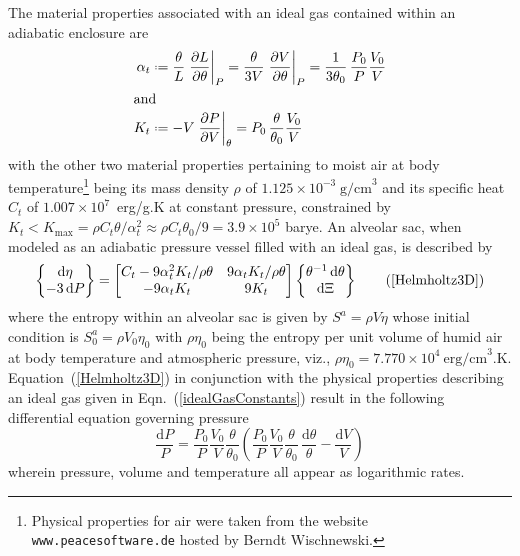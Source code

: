 The material properties associated with an ideal gas contained within an adiabatic enclosure are
\begin{subequations}
    \label{idealGasConstants}
    \begin{align}
\alpha_t & \defeq \frac{\theta}{L} \left. \frac{\partial L}{\partial \theta} \right|_P =
\frac{\theta}{3V} \left. \frac{\partial V}{\partial \theta} \right|_P = 
\frac{1}{3\theta_0} \, \frac{P_0}{P} \frac{V_0}{V} \\
\intertext{and}
K_t & \defeq -V \left. \frac{\partial P}{\partial V} \right|_{\theta} = 
P_0 \, \frac{\theta}{\theta_0} \frac{V_0}{V} 
\label{idealGasK}
\end{align}
\end{subequations}
with the other two material properties pertaining to moist air at body temperature\footnote{
    Physical properties for air were taken from the website \texttt{www.peacesoftware.de} hosted by Berndt Wischnewski.
}
being its mass density $\rho$ of $1.125 \times 10^{-3} \; \text{g/cm}^3$ and its specific heat $C_t$ of $1.007 \times 10^7$~erg/g.K at constant pressure, constrained by $K_t < K_{\max} = \rho C_t \theta / \alpha^2_t \approx \rho C_t \theta_0 / 9 = 3.9 \times 10^5$ barye.  An alveolar sac, when modeled as an adiabatic pressure vessel filled with an ideal gas, is described by
\begin{equation}
\left\{ \begin{matrix}
    \mathrm{d} \eta \\ -3 \, \mathrm{d} P
\end{matrix} \right\} = \begin{bmatrix}
    C_t - 9 \alpha^2_t K_t / \rho \theta & 
    9 \alpha_t K_t / \rho \theta \\
    -9 \alpha_t K_t & 9 K_t
\end{bmatrix} \left\{ \begin{matrix}
    \theta^{-1} \, \mathrm{d} \theta \\ \mathrm{d} \Xi
\end{matrix} \right\}
\tag{\ref{Helmholtz3D}}
\end{equation}
where the entropy within an alveolar sac is given by $S^a = \rho V \eta$ whose initial condition is $S^a_0 = \rho V_0 \eta_0$ with $\rho \eta_0$ being the entropy per unit volume of humid air at body temperature and atmospheric pressure, viz., $\rho \eta_0 = 7.770 \times 10^4 \: \text{erg/cm}^3\text{.K}$.  Equation~(\ref{Helmholtz3D}) in conjunction with the physical properties describing an ideal gas given in Eqn.~(\ref{idealGasConstants}) result in the following differential equation governing pressure
\begin{displaymath}
\frac{\mathrm{d} P}{P} = \frac{P_0}{P} \frac{V_0}{V} \frac{\theta}{\theta_0} \left( 
\frac{P_0}{P} \frac{V_0}{V} \frac{\theta}{\theta_0} \, 
\frac{\mathrm{d} \theta}{\theta} - 
\frac{\mathrm{d} V}{V} \right)
\end{displaymath}
wherein pressure, volume and temperature all appear as logarithmic rates.


